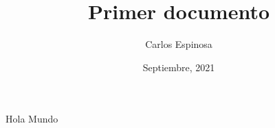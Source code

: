 \documentclass[12pt, letterpaper]{article}
\title{Primer documento}
\author{Carlos Espinosa}
\date{Septiembre, 2021}
\begin{document}
    Hola Mundo
\end{document}
